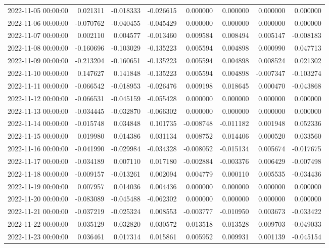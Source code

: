 \begin{tabular}{lrrrrrrr}
2022-11-05 00:00:00 & 0.021311 & -0.018333 & -0.026615 & 0.000000 & 0.000000 & 0.000000 & 0.000000 \\
2022-11-06 00:00:00 & -0.070762 & -0.040455 & -0.045429 & 0.000000 & 0.000000 & 0.000000 & 0.000000 \\
2022-11-07 00:00:00 & 0.002110 & 0.004577 & -0.013460 & 0.009584 & 0.008494 & 0.005147 & -0.008183 \\
2022-11-08 00:00:00 & -0.160696 & -0.103029 & -0.135223 & 0.005594 & 0.004898 & 0.000990 & 0.047713 \\
2022-11-09 00:00:00 & -0.213204 & -0.160651 & -0.135223 & 0.005594 & 0.004898 & 0.008524 & 0.021302 \\
2022-11-10 00:00:00 & 0.147627 & 0.141848 & -0.135223 & 0.005594 & 0.004898 & -0.007347 & -0.103274 \\
2022-11-11 00:00:00 & -0.066542 & -0.018953 & -0.026476 & 0.009198 & 0.018645 & 0.000470 & -0.043868 \\
2022-11-12 00:00:00 & -0.066531 & -0.045159 & -0.055428 & 0.000000 & 0.000000 & 0.000000 & 0.000000 \\
2022-11-13 00:00:00 & -0.034445 & -0.032870 & -0.066302 & 0.000000 & 0.000000 & 0.000000 & 0.000000 \\
2022-11-14 00:00:00 & -0.015748 & 0.034848 & 0.101735 & -0.008748 & -0.011182 & 0.001948 & 0.052336 \\
2022-11-15 00:00:00 & 0.019980 & 0.014386 & 0.031134 & 0.008752 & 0.014406 & 0.000520 & 0.033560 \\
2022-11-16 00:00:00 & -0.041990 & -0.029984 & -0.034328 & -0.008052 & -0.015134 & 0.005674 & -0.017675 \\
2022-11-17 00:00:00 & -0.034189 & 0.007110 & 0.017180 & -0.002884 & -0.003376 & 0.006429 & -0.007498 \\
2022-11-18 00:00:00 & -0.009157 & -0.013261 & 0.002094 & 0.004779 & 0.000110 & 0.005535 & -0.034436 \\
2022-11-19 00:00:00 & 0.007957 & 0.014036 & 0.004436 & 0.000000 & 0.000000 & 0.000000 & 0.000000 \\
2022-11-20 00:00:00 & -0.083089 & -0.045488 & -0.062302 & 0.000000 & 0.000000 & 0.000000 & 0.000000 \\
2022-11-21 00:00:00 & -0.037219 & -0.025324 & 0.008553 & -0.003777 & -0.010950 & 0.003673 & -0.033422 \\
2022-11-22 00:00:00 & 0.035129 & 0.032820 & 0.030572 & 0.013518 & 0.013528 & 0.009703 & -0.049033 \\
2022-11-23 00:00:00 & 0.036461 & 0.017314 & 0.015861 & 0.005952 & 0.009931 & 0.001139 & -0.045154 \\

\end{tabular}
